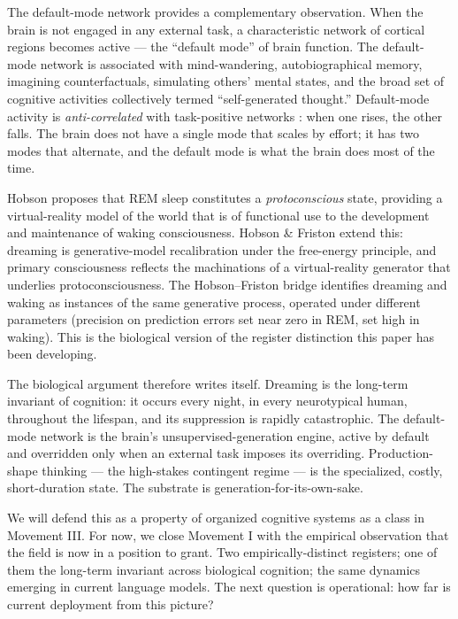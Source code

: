 \documentclass[11pt]{article}
\begin{document}
The default-mode network \cite{raichle2001default} provides a
complementary observation. When the brain is not engaged in any
external task, a characteristic network of cortical regions becomes
active --- the ``default mode'' of brain function. The default-mode
network is associated with mind-wandering, autobiographical memory,
imagining counterfactuals, simulating others' mental states, and the
broad set of cognitive activities collectively termed
``self-generated thought.'' Default-mode activity is
\emph{anti-correlated} with task-positive networks
\cite{fox2005anticorrelated}: when one rises, the other falls. The
brain does not have a single mode that scales by effort; it has two
modes that alternate, and the default mode is what the brain does most
of the time.

Hobson \cite{hobson2009protoconsciousness} proposes that REM sleep
constitutes a \emph{protoconscious} state, providing a virtual-reality
model of the world that is of functional use to the development and
maintenance of waking consciousness. Hobson \& Friston
\cite{hobson2012waking} extend this: dreaming is generative-model
recalibration under the free-energy principle, and primary
consciousness reflects the machinations of a virtual-reality generator
that underlies protoconsciousness. The Hobson--Friston bridge identifies
dreaming and waking as instances of the same generative process,
operated under different parameters (precision on prediction errors set
near zero in REM, set high in waking). This is the biological version
of the register distinction this paper has been developing.

The biological argument therefore writes itself. Dreaming is the
long-term invariant of cognition: it occurs every night, in every
neurotypical human, throughout the lifespan, and its suppression is
rapidly catastrophic. The default-mode network is the brain's
unsupervised-generation engine, active by default and overridden only
when an external task imposes its overriding. Production-shape thinking
--- the high-stakes contingent regime --- is the specialized, costly,
short-duration state. The substrate is generation-for-its-own-sake.

We will defend this as a property of organized cognitive systems as a
class in Movement III. For now, we close Movement I with the empirical
observation that the field is now in a position to grant. Two
empirically-distinct registers; one of them the long-term invariant
across biological cognition; the same dynamics emerging in current
language models. The next question is operational: how far is current
deployment from this picture?
\end{document}
